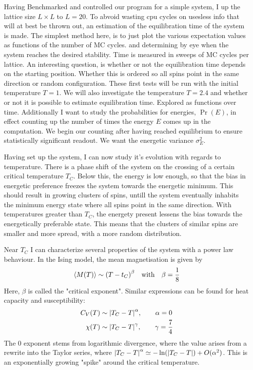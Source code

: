 \documentclass[10pt, twocolumn]{revtex4-1}
\begin{document}
Having Benchmarked and controlled our program for a simple system, I up the lattice size $L\times L$ to $L=20$. To abvoid wasting cpu cycles on usesless
info that will at best be thrown out, an estimation of the equilibration time of the system is made. The simplest method here, is to just plot the
various expectation values as functions of the number of MC cycles. and determining by eye when the system reaches the desired stability. Time is measured in
sweeps of MC cycles per lattice. An interesting question, is whether or not the equilibration time depends on the starting position. Whether this is
ordered so all spins point in the same direction or random configuration. These first tests will be run with the initial temperature $T=1$. We will also
investigate the temperature $T = 2.4$ and whether or not it is possible to estimate equilibration time. Explored as functions over time.
Additionally I want to study the probabilities for energies, $\Pr(E)$, in effect counting up the number of times the energy $E$ comes up in the computation.
We begin our counting after having reached equilibrium to ensure statistically significant readout. We want the energetic variance $\sigma_E^2$.

Having set up the system, I can now study it's evolution with regards to temperature. There is a phase shift of the system on the crossing of
a certain critical temperature $T_C$. Below this, the energy is low enough, so that the bias in energetic preference freezes the system towards the energetic
minimum. This should result in growing clusters of spins, untill the system eventually inhabits the minimum energy state where all spins point in the same
direction. With temperatures greater than $T_C$, the energety present lessens the bias towards the energetically preferable state. This means that the clusters
of similar spins are smaller and more spread, with a more random distribution.

Near $T_C$ I can characterize several properties of the system with a power law behaviour. In the Ising model, the mean magnetisation is given by
\[ \ev{M(T)} \sim \qty( T - t_C )^{\beta} \qq{with} \beta = \frac{1}{8} \]
Here, $\beta$ is called the "critical exponent". %
Similar expressions can be found for heat capacity and susceptibility:
\begin{align*}
    C_V(T) &\sim \qty| T_C - T |^{\alpha}, \qq{} \alpha = 0 \\
    \chi(T) &\sim \qty| T_C - T |^{\gamma}, \qq{} \gamma = \frac{7}{4}
\end{align*}
The 0 exponent stems from logarithmic divergence, where the value
arises from a rewrite into the Taylor series, where $\qty| T_C - T |^{\alpha} \simeq -\ln(\qty| T_C - T | ) + O(\alpha^2)$. This is an exponentially growing
"spike" around the critical temperature.
\end{document}
